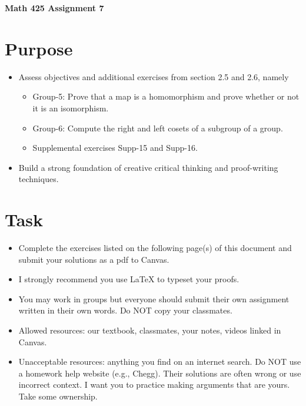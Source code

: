 \documentclass[12pt]{article}
\begin{document}
	\begin{center}
		{\Large \bf Math 425 Assignment 7}
	\end{center}
	\section*{Purpose}
		\begin{itemize}
			\item Assess objectives and additional exercises from section 2.5 and 2.6, namely
				\begin{itemize}
					\item Group-5: Prove that a map is a homomorphism and prove whether or not it is an isomorphism.
					\item Group-6:	Compute the right and left cosets of a subgroup of a group.
					\item Supplemental exercises Supp-15 and Supp-16.
				\end{itemize}
			\item Build a strong foundation of creative critical thinking and proof-writing techniques.
		\end{itemize}
	\section*{Task}
		\begin{itemize}
			\item Complete the exercises listed on the following page(s) of this document and submit your solutions as a pdf to Canvas.
			\item I strongly recommend you use LaTeX to typeset your proofs.
			\item You may work in groups but everyone should submit their own assignment written in their own words.  Do NOT copy your classmates.
			\item Allowed resources: our textbook, classmates, your notes, videos linked in Canvas.
			\item Unacceptable resources: anything you find on an internet search. Do NOT use a homework help website (e.g., Chegg). Their solutions are often wrong or use incorrect context.  I want you to practice making arguments that are yours. Take some ownership.
		\end{itemize}
\end{document}
